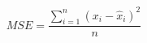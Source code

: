 \begin{equation}
MSE = \frac{\sum _{i=1}^{n} (x_{i}-\widehat{x}_{i})^{2}}{n}
\label{eq:rootMeanSquareError}
\end{equation}